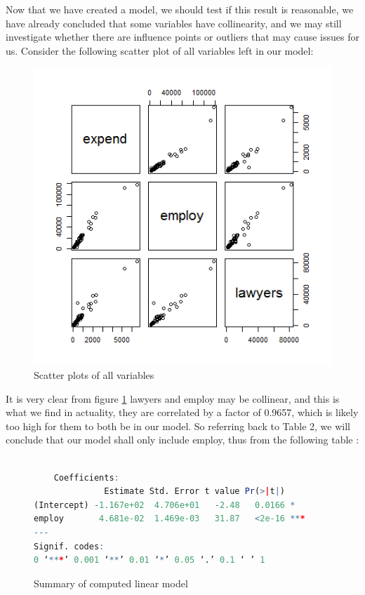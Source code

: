 \documentclass{article}
\begin{document}
	Now that we have created a model, we should test if this result is reasonable, we have already concluded that some variables have collinearity, and we may still investigate whether there are influence points or outliers that may cause issues for us. Consider the following scatter plot of all variables left in our model:
	
	    \begin{figure}[H]
        \centering
        \includegraphics[scale=0.5]{../results/4_99.png}
        \caption{Scatter plots of all variables}
        \label{fig:4collin}
    \end{figure}
    
    It is very clear from figure \ref{fig:4collin} lawyers and employ may be collinear, and this is what we find in actuality, they are correlated by a factor of 0.9657, which is likely too high for them to both be in our model. So referring back to Table 2, we will conclude that our model shall only include employ, thus from the following table :
  	\begin{figure}[H]
	\begin{lstlisting}[language=R]
  
    Coefficients:
              Estimate Std. Error t value Pr(>|t|)    
(Intercept) -1.167e+02  4.706e+01   -2.48   0.0166 *  
employ       4.681e-02  1.469e-03   31.87   <2e-16 ***
---
Signif. codes:  
0 ‘***’ 0.001 ‘**’ 0.01 ‘*’ 0.05 ‘.’ 0.1 ‘ ’ 1
    \end{lstlisting}
    \caption{Summary of computed linear model}
    \label{table:fournew}
    \end{figure}
    
\end{document}
